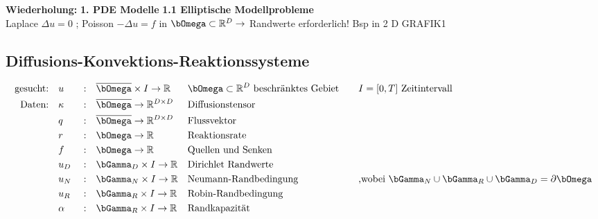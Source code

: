 \documentclass[12pt,twoside,reqno]{article}
\renewcommand{\Omega}{\bOmega}
\renewcommand{\Gamma}{\bGamma}
\newcommand{\R}{\mathbb{R}}
\theoremstyle{TheoWieners}
\theoremstyle{break}
\theoremstyle{app}
\newtheorem{Spezielle Lösungen}[app]{Spezielle Lösungen}
\newtheorem{Spezielle Lösungen der Poisson-Gleichung}[app]{Spezielle Lösungen der Poisson-Gleichung}
\newtheorem{Kartesische Gitter in 2-d}[app]{Kartesische Gitter in 2-d}
\newtheorem{Diskretisierungen hoher Ordnung}[app]{Diskretisierungen hoher Ordnung}
\newtheorem{Zyklische Reduktion}[app]{Zyklische Reduktion}
\begin{document}
          \textbf{Wiederholung:}
          \textbf{1. PDE Modelle}
          \textbf{1.1 Elliptische Modellprobleme} \\Laplace $\Delta u = 0$ ; Poisson $-\Delta u = f$ in $\Omega \subset \R^D \rightarrow$ Randwerte erforderlich! Bsp in 2 D GRAFIK1 
\subsection{Diffusions-Konvektions-Reaktionssysteme}

    \begin{align*}
        \text{gesucht:}&  &&u&&:&& \overline{\Omega} \times I \rightarrow \R && \Omega \subset \R^D \text{ beschränktes Gebiet } \ \ &&I=[0,T] \text{ Zeitintervall }\\
        \text{Daten:}& &&\kappa&& :&&  \overline{\Omega} \rightarrow \R^{D\times D}        && \text{Diffusionstensor} \\
                & &&q&&:&&  \overline{\Omega} \rightarrow \R^{D\times D}                        && \text{Flussvektor} \\
                & &&r&&:&&  \Omega \rightarrow \R                      && \text{Reaktionsrate} \\
                & &&f&&:&&  \Omega \rightarrow \R                        && \text{Quellen und Senken} \\
                & &&u_D&&:&&  \Gamma_D \times I \rightarrow \R                       && \text{Dirichlet Randwerte} \\
                & &&u_N&&:&&  \Gamma_N \times I  \rightarrow \R                        && \text{Neumann-Randbedingung} &&\text{,wobei }\Gamma_N \cup \Gamma_R \cup \Gamma_D = \partial \Omega \\
                & &&u_R&&:&& \Gamma_R \times I  \rightarrow \R                        && \text{Robin-Randbedingung} \\ 
                & &&\alpha&&:&&  \Gamma_R \times I  \rightarrow \R                       && \text{Randkapazität}           \end{align*}
\end{document}

